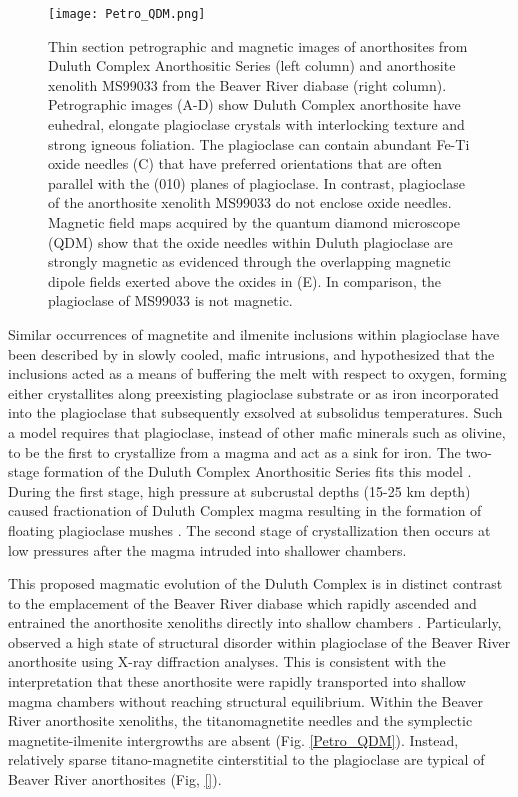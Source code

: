 \documentclass[draft]{agujournal2019}
\begin{document}
\begin{figure}
\noindent\texttt{[image: Petro\_QDM.png]}
\caption{\footnotesize{Thin section petrographic and magnetic images of anorthosites from Duluth Complex Anorthositic Series (left column) and anorthosite xenolith MS99033 from the Beaver River diabase (right column). Petrographic images (A-D) show Duluth Complex anorthosite have euhedral, elongate plagioclase crystals with interlocking texture and strong igneous foliation. The plagioclase can contain abundant Fe-Ti oxide needles (C) that have preferred orientations that are often parallel with the (010) planes of plagioclase. In contrast, plagioclase of the anorthosite xenolith MS99033 do not enclose oxide needles. Magnetic field maps acquired by the quantum diamond microscope (QDM) show that the oxide needles within Duluth plagioclase are strongly magnetic as evidenced through the overlapping magnetic dipole fields exerted above the oxides in (E). In comparison, the plagioclase of MS99033 is not magnetic. }}
\label{fig:Petro_QDM}
\end{figure}

Similar occurrences of magnetite and ilmenite inclusions within plagioclase have been described by  in slowly cooled, mafic intrusions, and \cite{Scofield1986a} hypothesized that the inclusions acted as a means of buffering the melt with respect to oxygen, forming either crystallites along preexisting plagioclase substrate or as iron incorporated into the plagioclase that subsequently exsolved at subsolidus temperatures. Such a model requires that plagioclase, instead of other mafic minerals such as olivine, to be the first to crystallize from a magma and act as a sink for iron. The two-stage formation of the Duluth Complex Anorthositic Series fits this model \cite{Miller1990a}. During the first stage, high pressure at subcrustal depths (15-25 km depth) caused fractionation of Duluth Complex magma resulting in the formation of floating plagioclase mushes \cite{Kushiro1980a}. The second stage of crystallization then occurs at low pressures after the magma intruded into shallower chambers. 

This proposed magmatic evolution of the Duluth Complex is in distinct contrast to the emplacement of the Beaver River diabase which rapidly ascended and entrained the anorthosite xenoliths directly into shallow chambers \cite{Flower1980a, Miller1997a, Zhang2021b}. Particularly,  observed a high state of structural disorder within plagioclase of the Beaver River anorthosite using X-ray diffraction analyses. This is consistent with the interpretation that these anorthosite were rapidly transported into shallow magma chambers without reaching structural equilibrium. Within the Beaver River anorthosite xenoliths, the titanomagnetite needles and the symplectic magnetite-ilmenite intergrowths are absent (Fig. \ref{Petro_QDM}). Instead, relatively sparse titano-magnetite cinterstitial to the plagioclase are typical of Beaver River anorthosites (Fig, \ref{}). 
\end{document}
